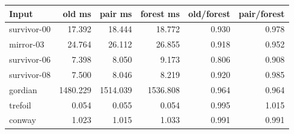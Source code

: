 \begin{center}\small
\begin{tabular}{@{}lrrrrr@{}}
\toprule
Input & old ms & pair ms & forest ms & old/forest & pair/forest \\
\midrule
survivor-00 & 17.392 & 18.444 & 18.772 & 0.930 & 0.978 \\
mirror-03 & 24.764 & 26.112 & 26.855 & 0.918 & 0.952 \\
survivor-06 & 7.398 & 8.050 & 9.173 & 0.806 & 0.908 \\
survivor-08 & 7.500 & 8.046 & 8.219 & 0.920 & 0.985 \\
gordian & 1480.229 & 1514.039 & 1536.808 & 0.964 & 0.964 \\
trefoil & 0.054 & 0.055 & 0.054 & 0.995 & 1.015 \\
conway & 1.023 & 1.015 & 1.033 & 0.991 & 0.991 \\
\bottomrule
\end{tabular}
\end{center}
